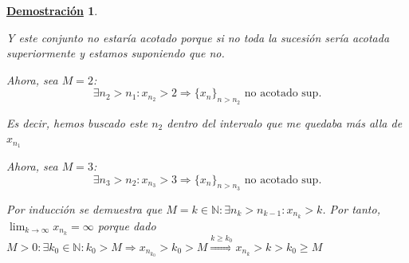 \documentclass[10pt,a4paper,openright]{book}
\theoremstyle{break}
\newtheorem*{demo}{\underline{Demostración}}
\begin{document}
\begin{demo}
\begin{itemize}
Y este conjunto no estaría acotado porque si no toda la sucesión sería acotada superiormente y estamos suponiendo que no.

Ahora, sea $M=2$:
$$\exists n_2>n_1: x_{n_2}>2\Rightarrow \{x_n\}_{n>n_2}\mbox{ no acotado sup.}$$

Es decir, hemos buscado este $n_2$ dentro del intervalo que me quedaba más alla de $x_{n_1}$

Ahora, sea $M=3$:
$$\exists n_3>n_2: x_{n_3}>3\Rightarrow \{x_n\}_{n>n_3}\mbox{ no acotado sup.}$$


Por inducción se demuestra que $M=k\in \mathbb N: \exists n_k>n_{k-1}: x_{n_k}>k$. Por tanto, $\lim_{k\rightarrow \infty} x_{n_k}=\infty$ porque dado $M>0: \exists k_0\in \mathbb N: k_0>M\Rightarrow x_{n_{k_0}}>k_0>M\stackrel{k\geq k_0}{\Rightarrow} x_{n_k}>k>k_0\geq M$
\end{itemize}
\end{demo}
\end{document}
